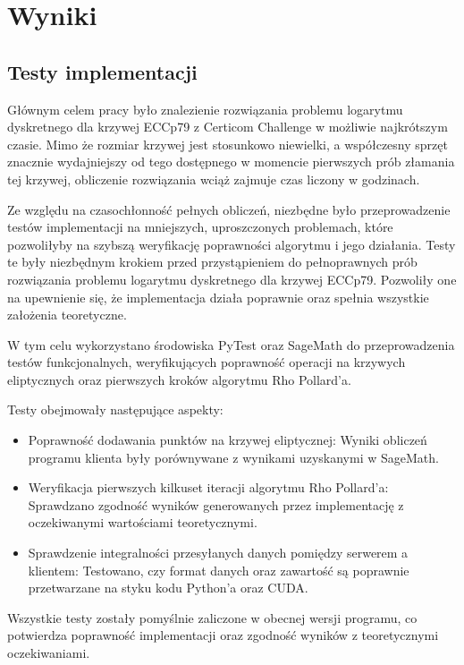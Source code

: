 \newpage
\section{Wyniki}
\subsection{Testy implementacji}

Głównym celem pracy było znalezienie rozwiązania problemu logarytmu dyskretnego
dla krzywej ECCp79 z Certicom Challenge w możliwie najkrótszym czasie. Mimo że
rozmiar krzywej jest stosunkowo niewielki, a współczesny sprzęt znacznie
wydajniejszy od tego dostępnego w momencie pierwszych prób złamania tej krzywej,
obliczenie rozwiązania wciąż zajmuje czas liczony w godzinach.

Ze względu na czasochłonność pełnych obliczeń, niezbędne było przeprowadzenie
testów implementacji na mniejszych, uproszczonych problemach, które pozwoliłyby
na szybszą weryfikację poprawności algorytmu i jego działania. Testy te były
niezbędnym krokiem przed przystąpieniem do pełnoprawnych prób rozwiązania
problemu logarytmu dyskretnego dla krzywej ECCp79. Pozwoliły one na upewnienie się,
że implementacja działa poprawnie oraz spełnia wszystkie założenia teoretyczne.

W tym celu wykorzystano środowiska PyTest oraz SageMath do przeprowadzenia testów
funkcjonalnych, weryfikujących poprawność operacji na krzywych eliptycznych
oraz pierwszych kroków algorytmu Rho Pollard'a.

Testy obejmowały następujące aspekty:
\begin{itemize}
    \item Poprawność dodawania punktów na krzywej eliptycznej:
          Wyniki obliczeń programu klienta były porównywane z wynikami uzyskanymi
          w SageMath.
    \item Weryfikacja pierwszych kilkuset iteracji algorytmu Rho Pollard'a:
          Sprawdzano zgodność wyników generowanych przez implementację z oczekiwanymi
          wartościami teoretycznymi.
    \item Sprawdzenie integralności przesyłanych danych pomiędzy serwerem a
          klientem: Testowano, czy format danych oraz zawartość są poprawnie przetwarzane
          na styku kodu Python'a oraz CUDA.
\end{itemize}

Wszystkie testy zostały pomyślnie zaliczone w obecnej wersji programu, co
potwierdza poprawność implementacji oraz zgodność wyników z teoretycznymi
oczekiwaniami.

